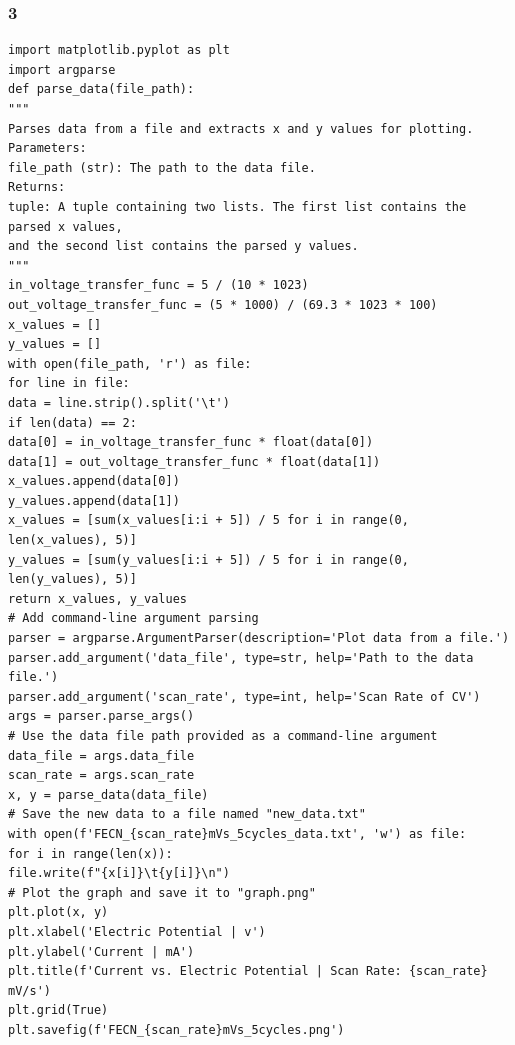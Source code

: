 \documentclass{article}
\begin{document}
\subsubsection*{3}
\begin{lstlisting}
import matplotlib.pyplot as plt
import argparse
def parse_data(file_path):
"""
Parses data from a file and extracts x and y values for plotting.
Parameters:
file_path (str): The path to the data file.
Returns:
tuple: A tuple containing two lists. The first list contains the parsed x values,
and the second list contains the parsed y values.
"""
in_voltage_transfer_func = 5 / (10 * 1023)
out_voltage_transfer_func = (5 * 1000) / (69.3 * 1023 * 100)
x_values = []
y_values = []
with open(file_path, 'r') as file:
for line in file:
data = line.strip().split('\t')
if len(data) == 2:
data[0] = in_voltage_transfer_func * float(data[0])
data[1] = out_voltage_transfer_func * float(data[1])
x_values.append(data[0])
y_values.append(data[1])
x_values = [sum(x_values[i:i + 5]) / 5 for i in range(0, len(x_values), 5)]
y_values = [sum(y_values[i:i + 5]) / 5 for i in range(0, len(y_values), 5)]
return x_values, y_values
# Add command-line argument parsing
parser = argparse.ArgumentParser(description='Plot data from a file.')
parser.add_argument('data_file', type=str, help='Path to the data file.')
parser.add_argument('scan_rate', type=int, help='Scan Rate of CV')
args = parser.parse_args()
# Use the data file path provided as a command-line argument
data_file = args.data_file
scan_rate = args.scan_rate
x, y = parse_data(data_file)
# Save the new data to a file named "new_data.txt"
with open(f'FECN_{scan_rate}mVs_5cycles_data.txt', 'w') as file:
for i in range(len(x)):
file.write(f"{x[i]}\t{y[i]}\n")
# Plot the graph and save it to "graph.png"
plt.plot(x, y)
plt.xlabel('Electric Potential | v')
plt.ylabel('Current | mA')
plt.title(f'Current vs. Electric Potential | Scan Rate: {scan_rate} mV/s')
plt.grid(True)
plt.savefig(f'FECN_{scan_rate}mVs_5cycles.png')
\end{lstlisting}
\end{document}
